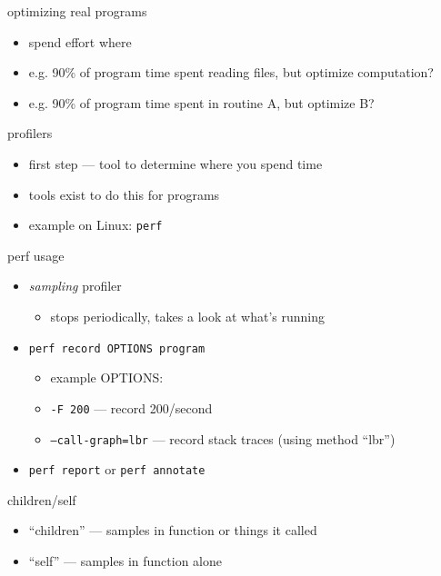 \begin{frame}{optimizing real programs}
    \begin{itemize}
    \item spend effort where 
    \item e.g. 90\% of program time spent reading files, but optimize computation?
    \item e.g. 90\% of program time spent in routine A, but optimize B?
    \end{itemize}
\end{frame}

\begin{frame}{profilers}
    \begin{itemize}
    \item first step --- tool to determine where you spend time
    \item tools exist to do this for programs
    \item example on Linux: \texttt{perf}
    \end{itemize}
\end{frame}

\begin{frame}{perf usage}
    \begin{itemize}
    \item \textit{sampling} profiler
        \begin{itemize}
        \item stops periodically, takes a look at what's running
        \end{itemize}
    \item \texttt{perf record OPTIONS program}
        \begin{itemize}
        \item example OPTIONS:
        \item \texttt{-F 200} --- record 200/second
        \item \texttt{--call-graph=lbr} --- record stack traces (using method ``lbr'')
        \end{itemize}
    \item \texttt{perf report} or \texttt{perf annotate}
    \end{itemize}
\end{frame}

\begin{frame}{children/self}
    \begin{itemize}
        \item ``children'' --- samples  in function or things it called
        \item ``self'' --- samples in function alone
    \end{itemize}
\end{frame}

